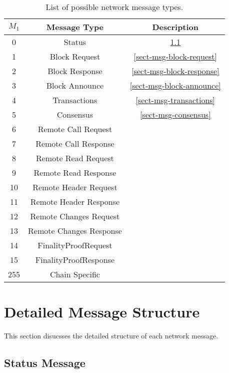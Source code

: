 \documentclass{book}
\begin{document}
\begin{table}[h]
  \begin{tabular}{|c|c|c|}
    \hline
    $M_1$ & Message Type & Description\\
    \hline
    0 & Status & \ref{sect-msg-status}\\
    1 & Block Request & \ref{sect-msg-block-request}\\
    2 & Block Response & \ref{sect-msg-block-response}\\
    3 & Block Announce & \ref{sect-msg-block-announce}\\
    4 & Transactions & \ref{sect-msg-transactions}\\
    5 & Consensus & \ref{sect-msg-consensus}\\
    6 & Remote Call Request & \\
    7 & Remote Call Response & \\
    8 & Remote Read Request & \\
    9 & Remote Read Response & \\
    10 & Remote Header Request & \\
    11 & Remote Header Response & \\
    12 & Remote Changes Request & \\
    13 & Remote Changes Response & \\
    14 & FinalityProofRequest & \\
    15 & FinalityProofResponse & \\
    255 & Chain Specific & \\
    \hline
  \end{tabular}
  \caption{\label{tabl-message-types}List of possible network message types.}
\end{table}

\section{Detailed Message Structure}\label{sect-message-detail}

This section disucsses the detailed structure of each network message.

\subsection{Status Message}\label{sect-msg-status}
\end{document}
